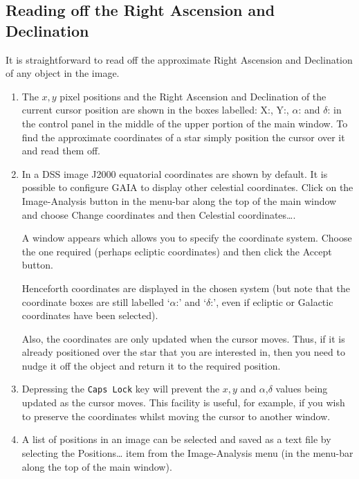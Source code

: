 \documentclass[twoside,11pt]{starlink}
\begin{document}
\subsection{Reading off the Right Ascension and Declination}

It is straightforward to read off the approximate Right Ascension and
Declination of any object in the image.

\begin{enumerate}

  \item The $x,y$\/ pixel positions and the Right Ascension and Declination
   of the current cursor position are shown in the boxes labelled: \textsf{X:}, \textsf{Y:}, \textsf{$\alpha$:} and \textsf{$\delta$:} in the control panel
   in the middle of the upper portion of the main window.  To find the
   approximate coordinates of a star simply position the cursor over it and
   read them off.

  \item In a DSS image J2000 equatorial coordinates are shown by default.
   It is possible to configure GAIA to display other celestial coordinates.
   Click on the \textsf{Image-Analysis} button in the menu-bar along the top
   of the main window and choose \textsf{Change coordinates} and then
   \textsf{Celestial coordinates\ldots}.

   A window appears which allows you to specify the coordinate system.
   Choose the one required (perhaps \textsf{ecliptic} coordinates) and then
   click the \textsf{Accept} button.

   Henceforth coordinates are displayed in the chosen system (but note
   that the coordinate boxes are still labelled `\textsf{$\alpha$:}' and
   `\textsf{$\delta$:}', even if ecliptic or Galactic coordinates have been
   selected).

   Also, the coordinates are only updated when the cursor moves.  Thus,
   if it is already positioned over the star that you are interested in,
   then you need to nudge it off the object and return it to the required
   position.

  \item Depressing the \texttt{Caps Lock} key will prevent the $x,y$\/ and
   $\alpha$,$\delta$\/ values being updated as the cursor moves.  This
   facility is useful, for example, if you wish to preserve the coordinates
   whilst moving the cursor to another window.

  \item A list of positions in an image can be selected and saved as a text
   file by selecting the \textsf{Positions\ldots} item from the \textsf{Image-Analysis} menu (in the menu-bar along the top of the main window).

\end{enumerate}
\end{document}
